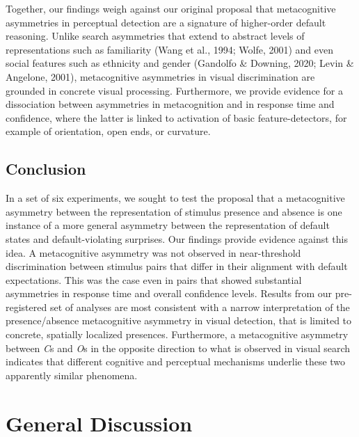 \documentclass[12pt,twoside]{reedthesis}
\begin{document}
Together, our findings weigh against our original proposal that metacognitive asymmetries in perceptual detection are a signature of higher-order default reasoning. Unlike search asymmetries that extend to abstract levels of representations such as familiarity (Wang et al., 1994; Wolfe, 2001) and even social features such as ethnicity and gender (Gandolfo \& Downing, 2020; Levin \& Angelone, 2001), metacognitive asymmetries in visual discrimination are grounded in concrete visual processing. Furthermore, we provide evidence for a dissociation between asymmetries in metacognition and in response time and confidence, where the latter is linked to activation of basic feature-detectors, for example of orientation, open ends, or curvature.

\hypertarget{conclusion-1}{%
\section{Conclusion}\label{conclusion-1}}

In a set of six experiments, we sought to test the proposal that a metacognitive asymmetry between the representation of stimulus presence and absence is one instance of a more general asymmetry between the representation of default states and default-violating surprises. Our findings provide evidence against this idea. A metacognitive asymmetry was not observed in near-threshold discrimination between stimulus pairs that differ in their alignment with default expectations. This was the case even in pairs that showed substantial asymmetries in response time and overall confidence levels. Results from our pre-registered set of analyses are most consistent with a narrow interpretation of the presence/absence metacognitive asymmetry in visual detection, that is limited to concrete, spatially localized presences. Furthermore, a metacognitive asymmetry between \emph{C}s and \emph{O}s in the opposite direction to what is observed in visual search indicates that different cognitive and perceptual mechanisms underlie these two apparently similar phenomena.

\hypertarget{general-discussion}{%
\chapter*{General Discussion}\label{general-discussion}}
\end{document}
